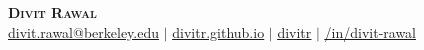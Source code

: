 \begin{center}
    \textbf{\Huge \scshape Divit Rawal} \\
    \vspace{1pt}
    \faEnvelope{} \href{mailto:divit.rawal@berkeley.edu}{\underline{divit.rawal@berkeley.edu}} $|$ 
    \faGlobe{} \href{https://www.divitr.github.io}{\underline{divitr.github.io}} $|$
    \faGithub{} \href{https://www.github.com/divitr}{\underline{divitr}} $|$
    \faLinkedin{} \href{https://www.linkedin.com/in/divit-rawal}{\underline{/in/divit-rawal}}
\end{center}